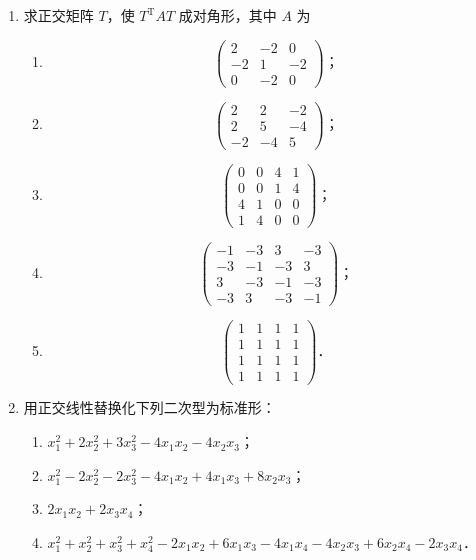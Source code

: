 \begin{enumerate}
  \ansproof
  \item 求正交矩阵 $T$，使 $T^{\mathrm{T}}AT$ 成对角形，其中 $A$ 为
  \begin{enumerate}
    \item \[
    \begin{pmatrix}
      2 & -2 & 0 \\
      -2 & 1 & -2 \\
      0 & -2 & 0
    \end{pmatrix}\text{；}
    \]
  \anssub
    \item \[
    \begin{pmatrix}
      2 & 2 & -2 \\
      2 & 5 & -4 \\
      -2 & -4 & 5
    \end{pmatrix}\text{；}
    \]
  \anssub
    \item \[
    \begin{pmatrix}
      0 & 0 & 4 & 1 \\
      0 & 0 & 1 & 4 \\
      4 & 1 & 0 & 0 \\
      1 & 4 & 0 & 0
    \end{pmatrix}\text{；}
    \]
  \anssub
    \item \[
    \begin{pmatrix}
      -1 & -3 & 3 & -3 \\
      -3 & -1 & -3 & 3 \\
      3 & -3 & -1 & -3 \\
      -3 & 3 & -3 & -1
    \end{pmatrix}\text{；}
    \]
  \anssub
    \item \[
    \begin{pmatrix}
      1 & 1 & 1 & 1 \\
      1 & 1 & 1 & 1 \\
      1 & 1 & 1 & 1 \\
      1 & 1 & 1 & 1
    \end{pmatrix}\text{．}
    \]
  \anssub
  \end{enumerate}

  \item 用正交线性替换化下列二次型为标准形：
  \begin{enumerate}
    \item $x_1^2+2x_2^2+3x_3^2-4x_1x_2-4x_2x_3$；
  \anssub
    \item $x_1^2-2x_2^2-2x_3^2-4x_1x_2+4x_1x_3+8x_2x_3$；
  \anssub
    \item $2x_1x_2+2x_3x_4$；
  \anssub
    \item $x_1^2+x_2^2+x_3^2+x_4^2-2x_1x_2+6x_1x_3-4x_1x_4-4x_2x_3+6x_2x_4-2x_3x_4$．
  \anssub
  \end{enumerate}


\end{enumerate}
